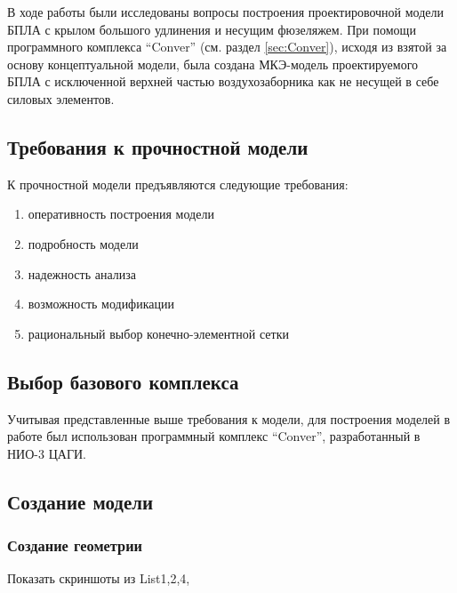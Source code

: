 
В ходе работы были исследованы вопросы построения проектировочной модели БПЛА с крылом большого удлинения и несущим фюзеляжем. При помощи программного комплекса ``Conver'' (см. раздел \ref{sec:Conver}), исходя из взятой за основу концептуальной модели, была создана МКЭ-модель проектируемого БПЛА с исключенной верхней частью воздухозаборника как не несущей в себе силовых элементов. 


\subsection{Требования к прочностной модели}

К прочностной модели предъявляются следующие требования:

\begin{enumerate}
\item оперативность построения модели
\item подробность модели
\item надежность анализа
\item возможность модификации 
\item рациональный выбор конечно-элементной сетки
\end{enumerate}

\subsection{Выбор базового комплекса}
Учитывая представленные выше требования к модели, для построения моделей в работе был использован программный комплекс ``Conver'', разработанный в НИО-3 ЦАГИ. 


\subsection{Создание модели}
\label{sec:creationOfOneModel}
\subsubsection{Создание геометрии}
Показать скриншоты из List1,2,4,

